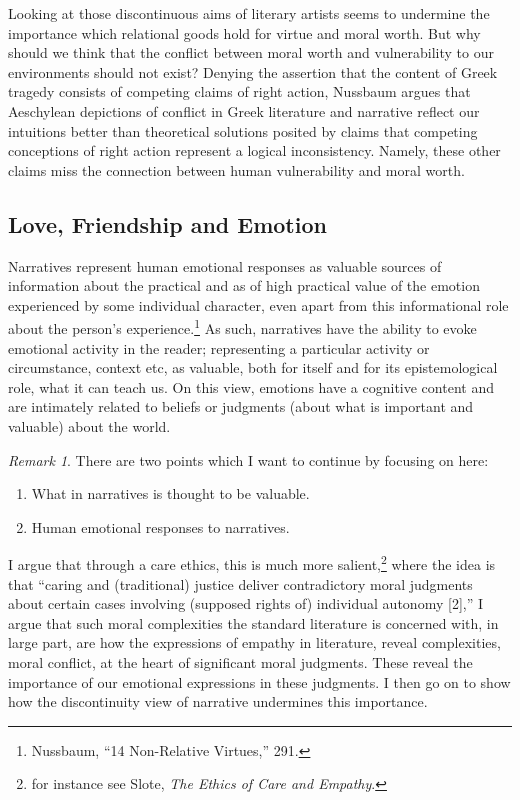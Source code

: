 \documentclass[phdthesis,12pt,final,a4paper]{wuthesis}
\theoremstyle{definition}
\theoremstyle{definition}
\theoremstyle{definition}
\theoremstyle{definition}
\theoremstyle{remark}
\newtheorem*{remark}{Remark}
\begin{document}
Looking at those discontinuous aims of literary artists seems to undermine the importance which relational goods hold for virtue and moral worth. But why should we think that the conflict between moral worth and vulnerability to our environments should not exist? Denying the assertion that the content of Greek tragedy consists of competing claims of right action, Nussbaum argues that Aeschylean depictions of conflict in Greek literature and narrative reflect our intuitions better than theoretical solutions posited by claims that competing conceptions of right action represent a logical inconsistency. Namely, these other claims miss the connection between human vulnerability and moral worth.

\subsection*{Love, Friendship and Emotion}\label{love-friendship-and-emotion}

Narratives represent human emotional responses as valuable sources of information about the practical and as of high practical value of the emotion experienced by some individual character, even apart from this informational role about the person's experience.\footnote{Nussbaum, {``14 {Non-Relative Virtues},''} 291.} As such, narratives have the ability to evoke emotional activity in the reader; representing a particular activity or circumstance, context etc, as valuable, both for itself and for its epistemological role, what it can teach us. On this view, emotions have a cognitive content and are intimately related to beliefs or judgments (about what is important and valuable) about the world.

\begin{remark}

\noindent There are two points which I want to continue by focusing on here:

\begin{enumerate}
\def\labelenumi{\arabic{enumi}.}
\tightlist
\item
  What in narratives is thought to be valuable.
\item
  Human emotional responses to narratives.
\end{enumerate}

\end{remark}

I argue that through a care ethics, this is much more salient,\footnote{for instance see Slote, \emph{The {Ethics} of {Care} and {Empathy}}.} where the idea is that ``caring and (traditional) justice deliver contradictory moral judgments about certain cases involving (supposed rights of) individual autonomy {[}2{]},'' I argue that such moral complexities the standard literature is concerned with, in large part, are how the expressions of empathy in literature, reveal complexities, moral conflict, at the heart of significant moral judgments. These reveal the importance of our emotional expressions in these judgments. I then go on to show how the discontinuity view of narrative undermines this importance.
\end{document}
